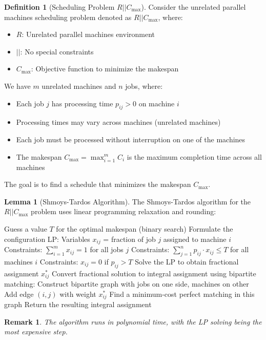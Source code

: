 \documentclass{article}
\newtheorem{remark}{Remark}
\theoremstyle{definition}
\newtheorem{lemma}{Lemma}
\newtheorem{definition}{Definition}
\begin{document}
\begin{definition}[Scheduling Problem $R||C_{\max}$]
Consider the unrelated parallel machines scheduling problem denoted as $R||C_{\max}$, where:
\begin{itemize}
    \item $R$: Unrelated parallel machines environment
    \item $||$: No special constraints
    \item $C_{\max}$: Objective function to minimize the makespan
\end{itemize}

We have $m$ unrelated machines and $n$ jobs, where:
\begin{itemize}
    \item Each job $j$ has processing time $p_{ij} > 0$ on machine $i$
    \item Processing times may vary across machines (unrelated machines)
    \item Each job must be processed without interruption on one of the machines
    \item The makespan $C_{\max} = \max_{i=1}^{m} C_i$ is the maximum completion time across all machines
\end{itemize}

The goal is to find a schedule that minimizes the makespan $C_{\max}$.
\end{definition}

\begin{lemma}[Shmoys-Tardos Algorithm]
The Shmoys-Tardos algorithm for the $R||C_{\max}$ problem uses linear programming relaxation and rounding:

\begin{algorithm}
\caption{Shmoys-Tardos Algorithm}
\begin{algorithmic}[1]
    \State Guess a value $T$ for the optimal makespan (binary search)
    \State Formulate the configuration LP:
    \State \quad Variables $x_{ij}$ = fraction of job $j$ assigned to machine $i$
    \State \quad Constraints: $\sum_{i=1}^{m} x_{ij} = 1$ for all jobs $j$
    \State \quad Constraints: $\sum_{j=1}^{n} p_{ij} \cdot x_{ij} \leq T$ for all machines $i$
    \State \quad Constraints: $x_{ij} = 0$ if $p_{ij} > T$
    \State Solve the LP to obtain fractional assignment $x_{ij}^*$
    \State Convert fractional solution to integral assignment using bipartite matching:
    \State \quad Construct bipartite graph with jobs on one side, machines on other
    \State \quad Add edge $(i,j)$ with weight $x_{ij}^*$
    \State \quad Find a minimum-cost perfect matching in this graph
    \State Return the resulting integral assignment
\end{algorithmic}
\end{algorithm}

\begin{remark}
The algorithm runs in polynomial time, with the LP solving being the most expensive step.
\end{remark}
\end{lemma}
\end{document}
